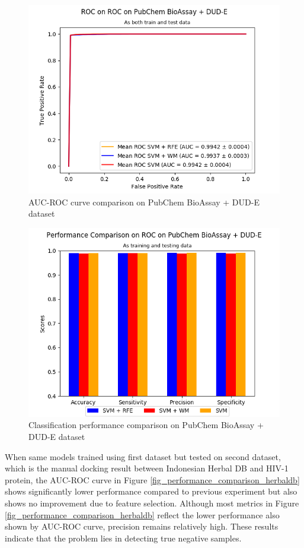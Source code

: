 \documentclass[conference,compsoc,12pt]{IEEEtran}
\begin{document}
	\begin{figure}
		\includegraphics[scale=0.5]{../images/03-evaluate-1_roc_chart.png}
		\caption{AUC-ROC curve comparison on PubChem BioAssay + DUD-E dataset}
		\label{fig_roc_comparison_pubchem}
	\end{figure}
	
	\begin{figure}
		\includegraphics[scale=0.5]{../images/03-evaluate-1_scores_chart.png}
		\caption{Classification performance comparison on PubChem BioAssay + DUD-E dataset}
		\label{fig_performance_comparison_pubchem}
	\end{figure}
	
	When same models trained using first dataset but tested on second dataset, which is the manual docking result between Indonesian Herbal DB and HIV-1 protein, the AUC-ROC curve in Figure \ref{fig_performance_comparison_herbaldb} shows significantly lower performance compared to previous experiment but also shows no improvement due to feature selection. Although most metrics in Figure \ref{fig_performance_comparison_herbaldb} reflect the lower performance also shown by AUC-ROC curve, precision remains relatively high. These results indicate that the problem lies in detecting true negative samples.
\end{document}
